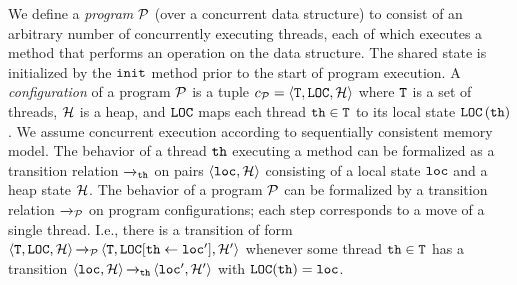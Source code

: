 We define a {\em program} ${\mathcal P}$ (over a concurrent data structure) to consist 
of an arbitrary number of concurrently executing threads, each of which
executes a method
that performs an operation on the data structure.
The shared state is initialized
by the $\tt init$ method prior to the start of program execution.
A {\it configuration} of a program ${\mathcal P}$ is a tuple
$c_{{\mathcal P}} = \left\langle{\tt T},{\tt LOC},{\mathcal H}\right\rangle$ where
${\tt T}$ is a set of threads,
${\mathcal H}$ is a heap, and ${\tt LOC}$
maps each thread ${\tt th}\in{\tt T}$ to its
local state ${\tt LOC}\left({\tt th}\right)$.
We assume concurrent execution according to sequentially consistent memory
model.
The behavior of a thread ${\tt th}$ executing a method can be formalized as 
a transition relation ${\xrightarrow{}{}}_{\!\!{\tt th}}$
on pairs $\left\langle{\tt loc},{\mathcal H}\right\rangle$ consisting of a local state
${\tt loc}$ and a heap state ${\mathcal H}$.
The behavior of a program ${\mathcal P}$ can be formalized by a transition relation
${\xrightarrow{}{}}_{\!\!{\mathcal P}}$ on program configurations; each step corresponds to a move of a single thread.
I.e., 
there is a transition of form
$\left\langle{\tt T},{\tt LOC},{\mathcal H}\right\rangle
{\xrightarrow{}{}}_{\!\!{\mathcal P}}
\left\langle{\tt T},{\tt LOC}[{\tt th}\leftarrow{\tt loc}'],{\mathcal H}'\right\rangle$
whenever some thread ${\tt th} \in {\tt T}$
has a transition
$\left\langle{\tt loc},{\mathcal H}\right\rangle{\xrightarrow{}{}}_{\!\!{\tt th}}\left\langle{\tt loc}',{\mathcal H}'\right\rangle$
with ${\tt LOC}({\tt th}) = {\tt loc}$.

